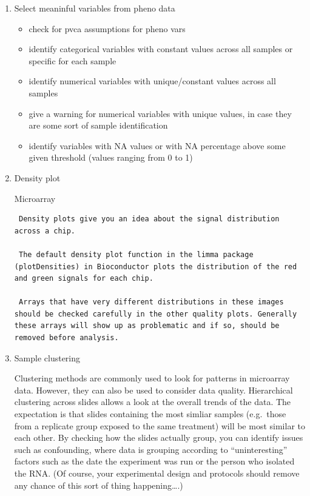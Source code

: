 \documentclass[
]{book}
\begin{document}
\begin{enumerate}
\def\labelenumi{\arabic{enumi})}
\item
  Select meaninful variables from pheno data

  \begin{itemize}
  \item
    check for pvca assumptions for pheno vars
  \item
    identify categorical variables with constant values across all samples or specific for each sample
  \item
    identify numerical variables with unique/constant values across all samples
  \item
    give a warning for numerical variables with unique values, in case they are some sort of sample identification
  \item
    identify variables with NA values or with NA percentage above some given threshold (values ranging from 0 to 1)
  \end{itemize}
\item
  Density plot

  Microarray

\begin{verbatim}
 Density plots give you an idea about the signal distribution across a chip.

 The default density plot function in the limma package (plotDensities) in Bioconductor plots the distribution of the red and green signals for each chip.

 Arrays that have very different distributions in these images should be checked carefully in the other quality plots. Generally these arrays will show up as problematic and if so, should be removed before analysis.
\end{verbatim}
\item
  Sample clustering

  Clustering methods are commonly used to look for patterns in microarray data. However, they can also be used to consider data quality. Hierarchical clustering across slides allows a look at the overall trends of the data. The expectation is that slides containing the most simliar samples (e.g.~those from a replicate group exposed to the same treatment) will be most similar to each other. By checking how the slides actually group, you can identify issues such as confounding, where data is grouping according to ``uninteresting'' factors such as the date the experiment was run or the person who isolated the RNA. (Of course, your experimental design and protocols should remove any chance of this sort of thing happening\ldots.)


\end{enumerate}
\end{document}
